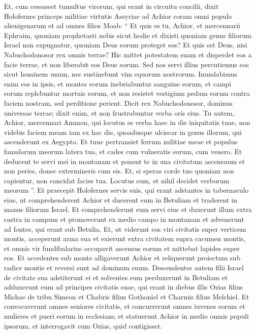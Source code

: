 \begin{biblechapter}
\begin{biblechapter}
\begin{biblechapter}
\begin{biblechapter}
\begin{biblechapter}
\begin{biblechapter}
\verse Et, cum cessasset tumultus virorum, qui erant in circuitu concilii, dixit Holofernes princeps militiae virtutis Assyriae ad Achior coram omni populo alienigenarum et ad omnes filios Moab: 
\verse “ Et quis es tu, Achior, et mercennarii Ephraim, quoniam prophetasti nobis sicut hodie et dixisti quoniam genus filiorum Israel non expugnatur, quoniam Deus eorum proteget eos? Et quis est Deus, nisi Nabuchodonosor rex omnis terrae? Hic mittet potestatem suam et disperdet eos a facie terrae, et non liberabit eos Deus eorum. 
\verse Sed nos servi illius percutiemus eos sicut hominem unum, nec sustinebunt vim equorum nostrorum. 
\verse Inundabimus enim eos in ipsis, et montes eorum inebriabuntur sanguine eorum, et campi eorum replebuntur mortuis eorum, et non resistet vestigium pedum eorum contra faciem nostram, sed perditione perient. Dicit rex Nabuchodonosor, dominus universae terrae; dixit enim, et non frustrabuntur verba oris eius. 
\verse Tu autem, Achior, mercennari Ammon, qui locutus es verba haec in die iniquitatis tuae, non videbis faciem meam iam ex hac die, quoadusque ulciscar in genus illorum, qui ascenderunt ex Aegypto. 
\verse Et tunc pertransiet ferrum militiae meae et populus famulorum meorum latera tua, et cades cum vulneratis eorum, cum venero. 
\verse Et deducent te servi mei in montanam et ponent te in una civitatum ascensuum 
\verse et non peries, donec extermineris cum eis. 
\verse Et, si speras corde tuo quoniam non capientur, non concidat facies tua. Locutus sum, et nihil decidet verborum meorum ”.
 \verse Et praecepit Holofernes servis suis, qui erant adstantes in tabernaculo eius, ut comprehenderent Achior et ducerent eum in Betuliam et traderent in manus filiorum Israel. 
\verse Et comprehenderunt eum servi eius et duxerunt illum extra castra in campum et promoverunt ex medio campo in montanam et advenerunt ad fontes, qui erant sub Betulia. 
\verse Et, ut viderunt eos viri civitatis super verticem montis, acceperunt arma sua et exierunt extra civitatem supra cacumen montis, et omnis vir fundibalarius occupavit ascensus eorum et mittebat lapides super eos. 
\verse Et accedentes sub monte alligaverunt Achior et reliquerunt proiectum sub radice montis et reversi sunt ad dominum suum. 
\verse Descendentes autem filii Israel de civitate sua adstiterunt ei et solventes eum perduxerunt in Betuliam et adduxerunt eum ad principes civitatis suae, 
\verse qui erant in diebus illis Ozias filius Michae de tribu Simeon et Chabris filius Gothoniel et Charmis filius Melchiel. 
\verse Et convocaverunt omnes seniores civitatis, et concurrerunt omnes iuvenes eorum et mulieres et pueri eorum in ecclesiam; et statuerunt Achior in medio omnis populi ipsorum, et interrogavit eum Ozias, quid contigisset. 

\end{biblechapter}
\end{biblechapter}
\end{biblechapter}
\end{biblechapter}
\end{biblechapter}
\end{biblechapter}
